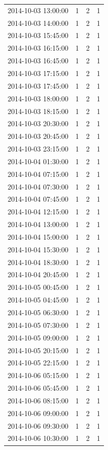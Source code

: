 \begin{tabular}{lrrr}
2014-10-03 13:00:00 & 1 & 2 & 1 \\
2014-10-03 14:00:00 & 1 & 2 & 1 \\
2014-10-03 15:45:00 & 1 & 2 & 1 \\
2014-10-03 16:15:00 & 1 & 2 & 1 \\
2014-10-03 16:45:00 & 1 & 2 & 1 \\
2014-10-03 17:15:00 & 1 & 2 & 1 \\
2014-10-03 17:45:00 & 1 & 2 & 1 \\
2014-10-03 18:00:00 & 1 & 2 & 1 \\
2014-10-03 18:15:00 & 1 & 2 & 1 \\
2014-10-03 20:30:00 & 1 & 2 & 1 \\
2014-10-03 20:45:00 & 1 & 2 & 1 \\
2014-10-03 23:15:00 & 1 & 2 & 1 \\
2014-10-04 01:30:00 & 1 & 2 & 1 \\
2014-10-04 07:15:00 & 1 & 2 & 1 \\
2014-10-04 07:30:00 & 1 & 2 & 1 \\
2014-10-04 07:45:00 & 1 & 2 & 1 \\
2014-10-04 12:15:00 & 1 & 2 & 1 \\
2014-10-04 13:00:00 & 1 & 2 & 1 \\
2014-10-04 15:00:00 & 1 & 2 & 1 \\
2014-10-04 15:30:00 & 1 & 2 & 1 \\
2014-10-04 18:30:00 & 1 & 2 & 1 \\
2014-10-04 20:45:00 & 1 & 2 & 1 \\
2014-10-05 00:45:00 & 1 & 2 & 1 \\
2014-10-05 04:45:00 & 1 & 2 & 1 \\
2014-10-05 06:30:00 & 1 & 2 & 1 \\
2014-10-05 07:30:00 & 1 & 2 & 1 \\
2014-10-05 09:00:00 & 1 & 2 & 1 \\
2014-10-05 20:15:00 & 1 & 2 & 1 \\
2014-10-05 22:15:00 & 1 & 2 & 1 \\
2014-10-06 05:15:00 & 1 & 2 & 1 \\
2014-10-06 05:45:00 & 1 & 2 & 1 \\
2014-10-06 08:15:00 & 1 & 2 & 1 \\
2014-10-06 09:00:00 & 1 & 2 & 1 \\
2014-10-06 09:30:00 & 1 & 2 & 1 \\
2014-10-06 10:30:00 & 1 & 2 & 1 \\

\end{tabular}
